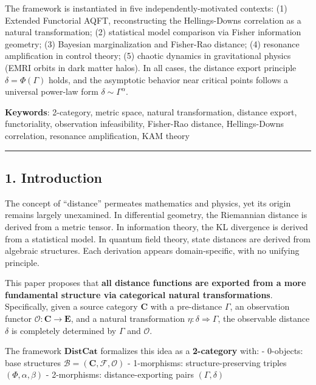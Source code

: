 \documentclass[
]{article}
\begin{document}
The framework is instantiated in five independently-motivated contexts:
(1) Extended Functorial AQFT, reconstructing the Hellings-Downs
correlation as a natural transformation; (2) statistical model
comparison via Fisher information geometry; (3) Bayesian marginalization
and Fisher-Rao distance; (4) resonance amplification in control theory;
(5) chaotic dynamics in gravitational physics (EMRI orbits in dark
matter halos). In all cases, the distance export principle \(\delta =
\Phi(\Gamma)\) holds, and the asymptotic behavior near critical points
follows a universal power-law form \(\delta \sim \Gamma^\alpha\).

\textbf{Keywords}: 2-category, metric space, natural transformation, distance export, functoriality, observation infeasibility, Fisher-Rao distance, Hellings-Downs correlation, resonance amplification, KAM theory

\begin{center}\rule{0.5\linewidth}{0.5pt}\end{center}

\subsection{1. Introduction}\label{introduction}

The concept of ``distance'' permeates mathematics and physics, yet its
origin remains largely unexamined. In differential geometry, the
Riemannian distance is derived from a metric tensor. In information
theory, the KL divergence is derived from a statistical model. In
quantum field theory, state distances are derived from algebraic
structures. Each derivation appears domain-specific, with no unifying
principle.

This paper proposes that \textbf{all distance functions are exported
from a more fundamental structure via categorical natural
transformations}. Specifically, given a source category \(\mathbf{C}\)
with a pre-distance \(\Gamma\), an observation functor
\(\mathcal{O}: \mathbf{C} \to \mathbf{E}\), and a natural transformation
\(\eta: \delta \Rightarrow \Gamma\), the observable distance \(\delta\)
is completely determined by \(\Gamma\) and \(\mathcal{O}\).

The framework \(\mathbf{DistCat}\) formalizes this idea as a
\textbf{2-category} with: - 0-objects: base structures
\(\mathcal{B} = (\mathbf{C}, \mathcal{F}, \mathcal{O})\) - 1-morphisms:
structure-preserving triples \((\Phi, \alpha, \beta)\) - 2-morphisms:
distance-exporting pairs \((\Gamma, \delta)\)
\end{document}
